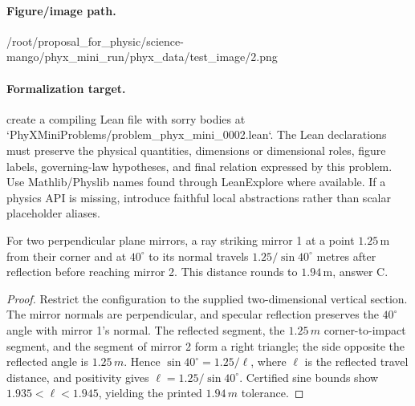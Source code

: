 \paragraph{Figure/image path.}
/root/proposal\_for\_physic/science-mango/phyx\_mini\_run/phyx\_data/test\_image/2.png

\paragraph{Formalization target.}
create a compiling Lean file with sorry bodies at `PhyXMiniProblems/problem\_phyx\_mini\_0002.lean`. The Lean declarations must preserve the physical quantities, dimensions or dimensional roles, figure labels, governing-law hypotheses, and final relation expressed by this problem.
Use Mathlib/Physlib names found through LeanExplore where available. If a physics API is missing, introduce faithful local abstractions rather than scalar placeholder aliases.

\begin{theorem}
\label{thm:physics:phyx_mini_0002:target}
For two perpendicular plane mirrors, a ray striking mirror 1 at a point
\(1.25\,\mathrm m\) from their corner and at \(40^\circ\) to its normal
travels \(1.25/\sin40^\circ\) metres after reflection before reaching mirror
2.  This distance rounds to \(1.94\,\mathrm m\), answer C.
\end{theorem}
\begin{proof}
Restrict the configuration to the supplied two-dimensional vertical section.
The mirror normals are perpendicular, and specular reflection preserves the
\(40^\circ\) angle with mirror 1's normal.  The reflected segment, the
\(1.25\,m\) corner-to-impact segment, and the segment of mirror 2 form a right
triangle; the side opposite the reflected angle is \(1.25\,m\).  Hence
\(\sin40^\circ=1.25/\ell\), where \(\ell\) is the reflected travel distance,
and positivity gives \(\ell=1.25/\sin40^\circ\).  Certified sine bounds show
\(1.935<\ell<1.945\), yielding the printed \(1.94\,m\) tolerance.
\end{proof}

